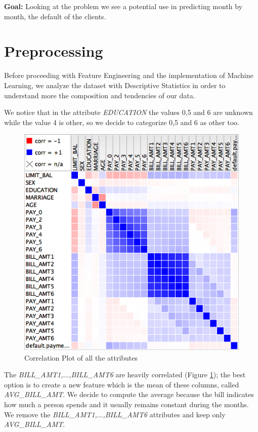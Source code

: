 \documentclass[fleqn,10pt]{SelfArx} %
\begin{document}
	
	\textbf{Goal:}\newline
	Looking at the problem we see a potential use in predicting month by month, the default of the clients.
	
	\section{Preprocessing}
	Before proceeding with Feature Engineering and the  implementation of Machine Learning, we analyze the dataset with Descriptive Statistics in order to understand more the composition and tendencies of our data.
	
	We notice that in the attribute \textit{EDUCATION} the values 0,5 and 6 are unknown while the value 4 is other, so we decide to categorize 0,5 and 6 as other too.
	\begin{figure}[h]
		\includegraphics[width=\linewidth]{correlation.png}
		\caption{Correlation Plot of all the attributes}
		\label{fig:corr}
	\end{figure}
	
	
	The \textit{BILL\_AMT1,$\hdots$,BILL\_AMT6} are heavily correlated (Figure \ref{fig:corr}); the best option is to create a new feature which is the mean of these columns, called \textit{AVG\_BILL\_AMT}.
	We decide to compute the average because the bill indicates how much a person spends and it usually remains constant during the months. We remove the \textit{BILL\_AMT1,$\hdots$,BILL\_AMT6} attributes and keep only \textit{AVG\_BILL\_AMT}.
	
\end{document}
